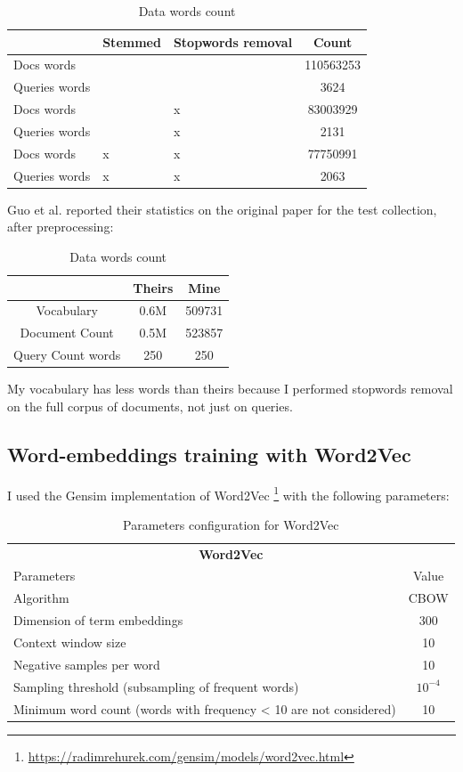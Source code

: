 \begin{table}[H]
\centering
\begin{tabular}{p{2cm}p{2cm}p{2cm}c}
 & Stemmed & Stopwords removal & Count \\ \hline
Docs words & & & 110563253 \\ \hline
Queries words & & & 3624 \\ \hline
Docs words & & x & 83003929 \\ \hline
Queries words & & x & 2131 \\ \hline
Docs words & x & x & 77750991 \\ \hline
Queries words & x & x & 2063 \\ \hline
\end{tabular}
\caption{Data words count}
\label{table:words count}
\end{table}

Guo et al. reported their statistics on the original paper for the test collection, after preprocessing:

\begin{table}[H]
\centering
\begin{tabular}{ccc}
 & Theirs & Mine \\ \hline
Vocabulary & 0.6M & 509731 \\
Document Count & 0.5M & 523857 \\
Query Count words & 250 & 250 \\ \hline
\end{tabular}
\caption{Data words count}
\label{table:words count}
\end{table}

My vocabulary has less words than theirs because I performed stopwords removal on the full corpus of documents, not just on queries.

\subsection{Word-embeddings training with Word2Vec}
\label{ssec:wemb}

I used the Gensim implementation of Word2Vec \footnote{\url{https://radimrehurek.com/gensim/models/word2vec.html}} with the following parameters:

\begin{table}[H]
\centering
\begin{tabular}{p{8cm}|c}
\multicolumn{2}{c}{\textbf{Word2Vec}} \\
Parameters & Value \\ \hline
Algorithm & CBOW \\
Dimension of term embeddings & 300 \\
Context window size & 10 \\
Negative samples per word & 10 \\
Sampling threshold (subsampling of frequent words) & $10^{-4}$ \\
Minimum word count (words with frequency < 10 are not considered) & 10 \\ \hline
\end{tabular}
\caption{Parameters configuration for Word2Vec}
\label{table:w2v_config}
\end{table}

